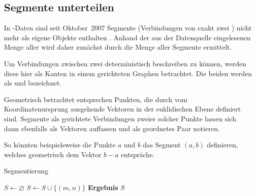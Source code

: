 \documentclass[../main/thesis.tex]{subfiles}
\begin{document}



\subsection{Segmente unterteilen}
\label{ch:split-algorithm}

In \osm-Daten sind seit Oktober~2007 Segmente (Verbindungen von exakt zwei ) nicht mehr als eigene Objekte enthalten .
Anhand der aus der Datenquelle eingelesenen Menge aller  wird daher zunächst durch  die Menge aller Segmente ermittelt.

Um Verbindungen zwischen zwei  deterministisch beschreiben zu können, werden diese hier als Kanten in einem gerichteten Graphen betrachtet.
Die beiden  werden als  und  bezeichnet.

Geometrisch betrachtet entsprechen  Punkten, die durch vom Koordinatenursprung ausgehende Vektoren in der euklidischen Ebene definiert sind.
Segmente als gerichtete Verbindungen zweier solcher Punkte lassen sich dann ebenfalls als Vektoren auffassen und als geordnetes Paar notieren.

So könnten beispielsweise die Punkte $a$ und $b$ das Segment $(a,b)$ definieren, welches geometrisch dem Vektor $b - a$ entspräche.

\begin{algorithmhere}{Segmentierung}
\label{alg:Segmentierung}
\begin{algorithmic}
	\State $S \gets \varnothing$
			\State $S \gets S \cup \{(m,n)\}$
		\EndFor
	\EndFor
	\State \textbf{Ergebnis} $S$
\EndFunction
\end{algorithmic}
\end{algorithmhere}
\end{document}
